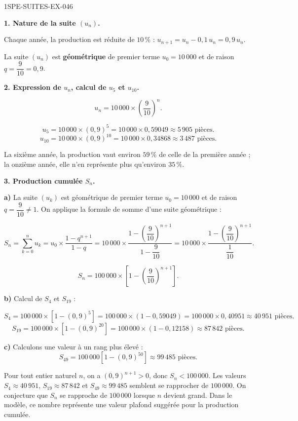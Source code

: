 \begin{corrige}{1SPE-SUITES-EX-046}

\textbf{1. Nature de la suite $(u_n)$.}

Chaque année, la production est réduite de $10\,\%$ : $u_{n+1} = u_n - 0{,}1\,u_n = 0{,}9\,u_n$.


La suite $(u_n)$ est \textbf{géométrique} de premier terme $u_0 = 10\,000$ et de raison $q = \dfrac{9}{10} = 0{,}9$.

\textbf{2. Expression de $u_n$, calcul de $u_5$ et $u_{10}$.}

\[
u_n = 10\,000 \times \left(\frac{9}{10}\right)^n.
\]

\[
u_5 = 10\,000 \times (0{,}9)^5 = 10\,000 \times 0{,}59049 \approx 5\,905 \text{ pièces.}
\]
\[
u_{10} = 10\,000 \times (0{,}9)^{10} = 10\,000 \times 0{,}34868 \approx 3\,487 \text{ pièces.}
\]

La sixième année, la production vaut environ $59\,\%$ de celle de la première année ; la onzième année, elle n'en représente plus qu'environ $35\,\%$.

\textbf{3. Production cumulée $S_n$.}

\textbf{a)} La suite $(u_k)$ est géométrique de premier terme $u_0 = 10\,000$ et de raison $q = \dfrac{9}{10}
\neq 1$. On applique la formule de somme d'une suite géométrique :

\[
S_n = \sum_{k=0}^{n} u_k = u_0 \times \frac{1 - q^{n+1}}{1 - q} = 10\,000 \times \frac{1 - \left(\dfrac{9}{10}\right)^{n+1}}{1 - \dfrac{9}{10}} = 10\,000 \times \frac{1 - \left(\dfrac{9}{10}\right)^{n+1}}{\dfrac{1}{10}}.
\]

\[
\boxed{S_n = 100\,000 \times \left[1 - \left(\frac{9}{10}\right)^{n+1}\right].}
\]

\textbf{b)} Calcul de $S_4$ et $S_{19}$ :

\[
S_4 = 100\,000 \times \left[1 - (0{,}9)^5\right] = 100\,000 \times (1 - 0{,}59049) = 100\,000 \times 0{,}40951 \approx 40\,951 \text{ pièces.}
\]
\[
S_{19} = 100\,000 \times \left[1 - (0{,}9)^{20}\right] = 100\,000 \times (1 - 0{,}12158) \approx 87\,842 \text{ pièces.}
\]

\textbf{c)} Calculons une valeur à un rang plus élevé :
\[
S_{49}=100\,000\left[1-(0{,}9)^{50}\right]\approx99\,485\text{ pièces.}
\]

Pour tout entier naturel $n$, on a $(0{,}9)^{n+1}>0$, donc $S_n<100\,000$. Les valeurs $S_4\approx40\,951$, $S_{19}\approx87\,842$ et $S_{49}\approx99\,485$ semblent se rapprocher de $100\,000$. On conjecture que $S_n$ se rapproche de $100\,000$ lorsque $n$ devient grand. Dans le modèle, ce nombre représente une valeur plafond suggérée pour la production cumulée.


\end{corrige}
